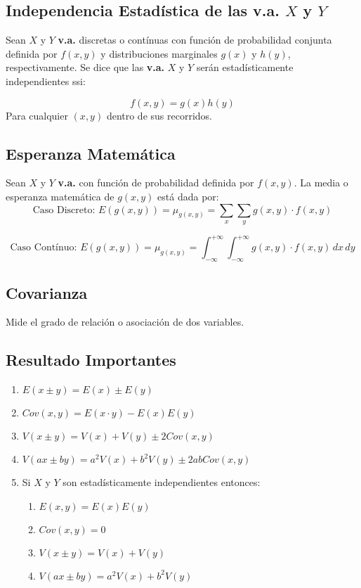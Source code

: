 \subsection{Independencia Estadística de las v.a. $X$ y $Y$}
Sean $X$ y $Y$ \textbf{v.a.} discretas o contínuas con función de probabilidad conjunta definida por $f(x,y)$ y distribuciones marginales $g(x)$ y $h(y)$, respectivamente. Se dice que las \textbf{v.a.} $X$ y $Y$ serán estadísticamente independientes ssi:

$$f(x,y)=g(x)h(y)$$
Para cualquier $(x,y)$ dentro de sus recorridos.
\subsection{Esperanza Matemática}
Sean $X$ y $Y$ \textbf{v.a.} con función de probabilidad definida por $f(x,y)$. La media o esperanza matemática de $g(x,y)$ está dada por:
$$
\text{Caso Discreto: }
E(g(x,y))=\mu_{g(x,y)}=\displaystyle\sum_{x}\displaystyle\sum_{y} g(x,y)\cdot f(x,y)
$$

$$
\text{Caso Contínuo: }
E(g(x,y))=\mu_{g(x,y)}=\displaystyle\int_{-\infty}^{+\infty}\displaystyle\int_{-\infty}^{+\infty} g(x,y)\cdot f(x,y) \,dx \,dy
$$
\subsection{Covarianza}
Mide el grado de relación o asociación de dos variables.
\subsection{Resultado Importantes}
\begin{enumerate}
\item $E(x\pm y)=E(x)\pm E(y)$
\item $Cov(x,y)=E(x\cdot y) - E(x)E(y)$
\item $V(x\pm y)=V(x)+V(y)\pm 2Cov(x,y)$
\item $V(ax\pm by)=a^2 V(x)+b^2V(y)\pm 2abCov(x,y)$
\item Si $X$ y $Y$ son estadísticamente independientes entonces:
\begin{enumerate}
\item $E(x,y)=E(x)E(y)$
\item $Cov(x,y)=0$
\item $V(x\pm y)=V(x)+V(y)$
\item $V(ax\pm by)=a^2V(x)+b^2V(y)$
\end{enumerate}
\end{enumerate}